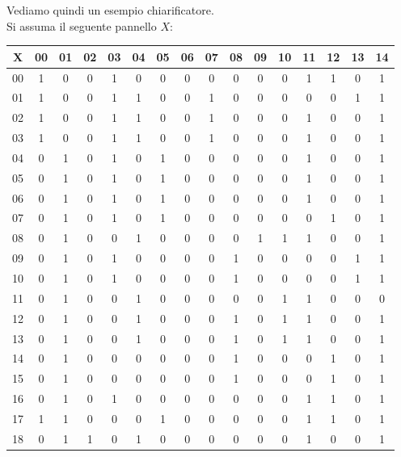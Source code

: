 \begin{esempio}
  Vediamo quindi un esempio chiarificatore.\\
  Si assuma il seguente pannello $X$:
  \begin{table}[H]
    \centering
    \footnotesize
    \begin{tabular}{c|ccccccccccccccc}
      X & 00 & 01 & 02 & 03 & 04 & 05 & 06 & 07 & 08 & 09 & 10 & 11 & 12 & 13
      & 14 \\
      \hline
      00 & 1 & 0 & 0 & 1 & 0 & 0 & 0 & 0 & 0 & 0 & 0 & 1 & 1 & 0 & 1 \\
      01 & 1 & 0 & 0 & 1 & 1 & 0 & 0 & 1 & 0 & 0 & 0 & 0 & 0 & 1 & 1 \\
      02 & 1 & 0 & 0 & 1 & 1 & 0 & 0 & 1 & 0 & 0 & 0 & 1 & 0 & 0 & 1 \\
      03 & 1 & 0 & 0 & 1 & 1 & 0 & 0 & 1 & 0 & 0 & 0 & 1 & 0 & 0 & 1 \\
      04 & 0 & 1 & 0 & 1 & 0 & 1 & 0 & 0 & 0 & 0 & 0 & 1 & 0 & 0 & 1 \\
      05 & 0 & 1 & 0 & 1 & 0 & 1 & 0 & 0 & 0 & 0 & 0 & 1 & 0 & 0 & 1 \\
      06 & 0 & 1 & 0 & 1 & 0 & 1 & 0 & 0 & 0 & 0 & 0 & 1 & 0 & 0 & 1 \\
      07 & 0 & 1 & 0 & 1 & 0 & 1 & 0 & 0 & 0 & 0 & 0 & 0 & 1 & 0 & 1 \\
      08 & 0 & 1 & 0 & 0 & 1 & 0 & 0 & 0 & 0 & 1 & 1 & 1 & 0 & 0 & 1 \\
      09 & 0 & 1 & 0 & 1 & 0 & 0 & 0 & 0 & 1 & 0 & 0 & 0 & 0 & 1 & 1 \\
      10 & 0 & 1 & 0 & 1 & 0 & 0 & 0 & 0 & 1 & 0 & 0 & 0 & 0 & 1 & 1 \\
      11 & 0 & 1 & 0 & 0 & 1 & 0 & 0 & 0 & 0 & 0 & 1 & 1 & 0 & 0 & 0 \\
      12 & 0 & 1 & 0 & 0 & 1 & 0 & 0 & 0 & 1 & 0 & 1 & 1 & 0 & 0 & 1 \\
      13 & 0 & 1 & 0 & 0 & 1 & 0 & 0 & 0 & 1 & 0 & 1 & 1 & 0 & 0 & 1 \\
      14 & 0 & 1 & 0 & 0 & 0 & 0 & 0 & 0 & 1 & 0 & 0 & 0 & 1 & 0 & 1 \\
      15 & 0 & 1 & 0 & 0 & 0 & 0 & 0 & 0 & 1 & 0 & 0 & 0 & 1 & 0 & 1 \\
      16 & 0 & 1 & 0 & 1 & 0 & 0 & 0 & 0 & 0 & 0 & 0 & 1 & 1 & 0 & 1 \\
      17 & 1 & 1 & 0 & 0 & 0 & 1 & 0 & 0 & 0 & 0 & 0 & 1 & 1 & 0 & 1 \\
      18 & 0 & 1 & 1 & 0 & 1 & 0 & 0 & 0 & 0 & 0 & 0 & 1 & 0 & 0 & 1 \\

\end{tabular}
\end{table}
\end{esempio}
